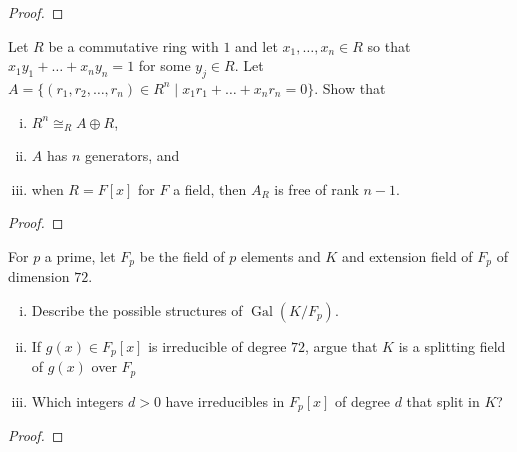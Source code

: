 \documentclass{article}
\newenvironment{problem}[2][Problem]{\begin{trivlist}
\item[\hskip \labelsep {\bfseries #1}\hskip \labelsep {\bfseries #2.}]}{\end{trivlist}}
\newcommand{\set}[1]{\{#1\}}
\newcommand{\Gal}{\operatorname{Gal}}
\begin{document}
\begin{proof}
\end{proof}
\pagebreak

\begin{problem}{5}
  Let $R$ be a commutative ring with $1$ and let $x_1, \hdots, x_n \in R$
  so that $x_1y_1 + \hdots + x_ny_n = 1$ for some $y_j \in R$. Let
  $A = \set{(r_1, r_2, \hdots, r_n) \in R^n \mid x_1r_1 + \hdots + x_nr_n = 0}.$
  Show that \begin{enumerate}[(i)]
    \item $R^n \cong_R A \oplus R$,
    \item $A$ has $n$ generators, and
    \item when $R = F[x]$ for $F$ a field, then $A_R$ is free of rank $n-1$.
  \end{enumerate}
\end{problem}

\begin{proof}
\end{proof}
\pagebreak

\begin{problem}{6}
  For $p$ a prime, let $F_p$ be the field of $p$ elements and $K$ and extension
  field of $F_p$ of dimension $72$. \begin{enumerate}[(i)]
    \item Describe the possible structures of $\Gal(K/F_p)$.
    \item If $g(x) \in F_p[x]$ is irreducible of degree $72$, argue that $K$ is
      a splitting field of $g(x)$ over $F_p$
    \item Which integers $d > 0$ have irreducibles in $F_p[x]$ of degree $d$
      that split in $K$?
  \end{enumerate}
\end{problem}

\begin{proof}
\end{proof}
\end{document}
